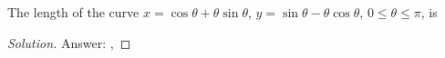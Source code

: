 \begin{problem}
The length of the curve $x=\cos\theta+\theta\sin\theta$,
$y=\sin\theta-\theta\cos\theta$, $0\leq\theta\leq\pi$, is
\end{problem}
\begin{proof}[Solution]
Answer: {\color{Green}}, {\color{Red}}
\end{proof}

